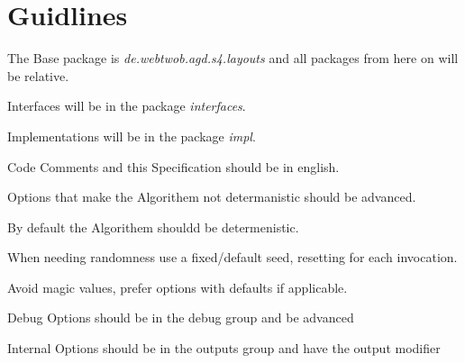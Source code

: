 \section{Guidlines}

\begin{list}{-}{}
\item The Base package is \textit{de.webtwob.agd.s4.layouts} and all packages from here on will be relative.
\item Interfaces will be in the package \textit{interfaces}.
\item Implementations will be in the package \textit{impl}.
\item Code Comments and this Specification should be in english.
\item Options that make the Algorithem not determanistic should be advanced.
\item By default the Algorithem shouldd be determenistic.
\item When needing randomness use a fixed/default seed, resetting for each invocation.
\item Avoid magic values, prefer options with defaults if applicable.
\item Debug Options should be in the debug group and be advanced
\item Internal Options should be in the outputs group and have the output modifier
\end{list}
